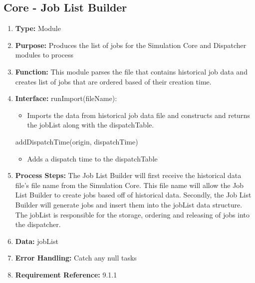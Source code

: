 \documentclass[paper=letter, fontsize=10pt]{scrartcl}
\numberwithin{equation}{section}		%
\numberwithin{figure}{section}			%
\numberwithin{table}{section}				%
\begin{document}
\subsection{Core - Job List Builder}
\begin{enumerate}[]
	\item \textbf{Type:} Module
	\item \textbf{Purpose:} Produces the list of jobs for the Simulation Core and Dispatcher modules to process
	\item \textbf{Function:} This module parses the file that contains historical job data and creates list of jobs that are ordered based of their creation time.
	\item \textbf{Interface:} \newline
		runImport(fileName):
		\begin{itemize}
			\item Imports the data from historical job data file and constructs and returns the jobList along with the dispatchTable.
		\end{itemize}
		addDispatchTime(origin, dispatchTime)
		\begin{itemize}
			\item Adds a dispatch time to the dispatchTable
		\end{itemize}
	\item \textbf{Process Steps:} The Job List Builder will first receive the historical data file's file name from the Simulation Core.  This file name will allow the Job List Builder to create jobs based off of historical data.  Secondly, the Job List Builder will generate jobs and insert them into the jobList data structure.  The jobList is responsible for the storage, ordering and releasing of jobs into the dispatcher.
	\item \textbf{Data:} jobList
	\item \textbf{Error Handling:} Catch any null tasks
	\item \textbf{Requirement Reference:} 9.1.1
\end{enumerate}
\end{document}
